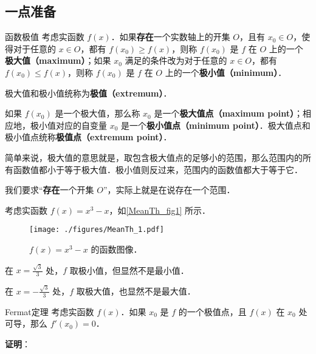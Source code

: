 

\subsection{一点准备}

\begin{definition}{函数极值}
考虑实函数 $f(x)$．如果\textbf{存在}一个实数轴上的开集 $O$，且有 $x_0\in O$，使得对于任意的 $x\in O$，都有 $f(x_0)\geq f(x)$，则称 $f(x_0)$ 是 $f$ 在 $O$ 上的一个\textbf{极大值（maximum）}；如果 $x_0$ 满足的条件改为对于任意的 $x\in O$，都有 $f(x_0)\leq f(x)$，则称 $f(x_0)$ 是 $f$ 在 $O$ 上的一个\textbf{极小值（minimum）}．

极大值和极小值统称为\textbf{极值（extremum）}．

如果 $f(x_0)$ 是一个极大值，那么称 $x_0$ 是一个\textbf{极大值点（maximum point）}；相应地，极小值对应的自变量 $x_0$ 是一个\textbf{极小值点（minimum point）}．极大值点和极小值点统称\textbf{极值点（extremum point）}．
\end{definition}


简单来说，极大值的意思就是，取包含极大值点的足够小的范围，那么范围内的所有函数值都小于等于极大值．极小值则反过来，范围内的函数值都大于等于它．

我们要求“\textbf{存在}一个开集 $O$”，实际上就是在说存在一个范围．

\begin{example}{}\label{MeanTh_ex1}
考虑实函数 $f(x)=x^3-x$，如\autoref{MeanTh_fig1} 所示．

\begin{figure}[ht]
\centering
\texttt{[image: ./figures/MeanTh\_1.pdf]}
\caption{$f(x)=x^3-x$ 的函数图像．} \label{MeanTh_fig1}
\end{figure}

在 $x=\frac{\sqrt{3}}{3}$ 处，$f$ 取极小值，但显然不是最小值．

在 $x=-\frac{\sqrt{3}}{3}$ 处，$f$ 取极大值，也显然不是最大值．


\end{example}


\begin{theorem}{Fermat定理}\label{MeanTh_the1}
考虑实函数 $f(x)$．如果 $x_0$ 是 $f$ 的一个极值点，且 $f(x)$ 在 $x_0$ 处可导，那么 $f'(x_0)=0$．
\end{theorem}

\textbf{证明}：

